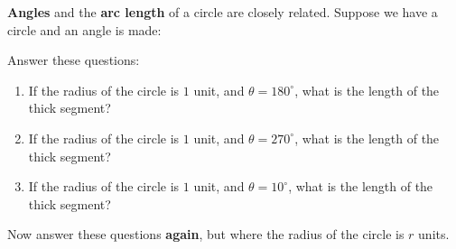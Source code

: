 \documentclass[noauthor,hints,nooutcomes,handout]{ximera}
\begin{document}
\begin{question}
\textbf{Angles} and the \textbf{arc length} of a circle are closely
related. Suppose we have a circle and an angle is made:

\begin{center}
 
\end{center}
Answer these questions:
\begin{enumerate}
\item If the radius of the circle is $1$ unit, and $\theta=180^\circ$, what is the length of the thick segment?
\item If the radius of the circle is $1$ unit, and $\theta=270^\circ$, what is the length of the thick segment?
\item If the radius of the circle is $1$ unit, and $\theta=10^\circ$, what is the length of the thick segment?
\end{enumerate}
Now answer these questions \textbf{again}, but where the radius of the
circle is $r$ units.
\end{question}
\mynewpage
\end{document}
